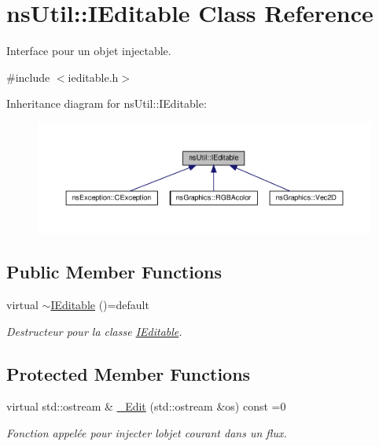 \hypertarget{classns_util_1_1_i_editable}{}\section{ns\+Util\+:\+:I\+Editable Class Reference}
\label{classns_util_1_1_i_editable}


Interface pour un objet injectable.  




{\ttfamily \#include $<$ieditable.\+h$>$}



Inheritance diagram for ns\+Util\+:\+:I\+Editable\+:
\nopagebreak
\begin{figure}[H]
\begin{center}
\leavevmode
\includegraphics[width=350pt]{classns_util_1_1_i_editable__inherit__graph}
\end{center}
\end{figure}
\subsection*{Public Member Functions}
\begin{DoxyCompactItemize}
\item 
virtual \hyperlink{classns_util_1_1_i_editable_a504b91af8e4efa46357d7236b86b8e2e}{$\sim$\+I\+Editable} ()=default
\begin{DoxyCompactList}\small\item\em Destructeur pour la classe \hyperlink{classns_util_1_1_i_editable}{I\+Editable}. \end{DoxyCompactList}\end{DoxyCompactItemize}
\subsection*{Protected Member Functions}
\begin{DoxyCompactItemize}
\item 
virtual std\+::ostream \& \hyperlink{classns_util_1_1_i_editable_ab20bbe582b95383ed3f1453109035853}{\+\_\+\+Edit} (std\+::ostream \&os) const =0
\begin{DoxyCompactList}\small\item\em Fonction appelée pour injecter l\textquotesingle{}objet courant dans un flux. \end{DoxyCompactList}\end{DoxyCompactItemize}
